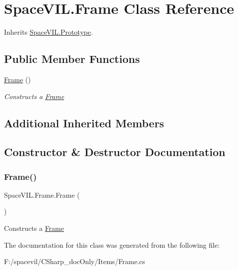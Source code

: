 \hypertarget{class_space_v_i_l_1_1_frame}{}\section{Space\+V\+I\+L.\+Frame Class Reference}
\label{class_space_v_i_l_1_1_frame}


Inherits \mbox{\hyperlink{class_space_v_i_l_1_1_prototype}{Space\+V\+I\+L.\+Prototype}}.

\subsection*{Public Member Functions}
\begin{DoxyCompactItemize}
\item 
\mbox{\hyperlink{class_space_v_i_l_1_1_frame_a637421f7d67b16e11064a78867a386db}{Frame}} ()
\begin{DoxyCompactList}\small\item\em Constructs a \mbox{\hyperlink{class_space_v_i_l_1_1_frame}{Frame}} \end{DoxyCompactList}\end{DoxyCompactItemize}
\subsection*{Additional Inherited Members}


\subsection{Constructor \& Destructor Documentation}
\mbox{\label{class_space_v_i_l_1_1_frame_a637421f7d67b16e11064a78867a386db}} 
\subsubsection{\texorpdfstring{Frame()}{Frame()}}
{\footnotesize\ttfamily Space\+V\+I\+L.\+Frame.\+Frame (\begin{DoxyParamCaption}{ }\end{DoxyParamCaption})}



Constructs a \mbox{\hyperlink{class_space_v_i_l_1_1_frame}{Frame}} 



The documentation for this class was generated from the following file\+:\begin{DoxyCompactItemize}
\item 
F\+:/spacevil/\+C\+Sharp\+\_\+doc\+Only/\+Items/Frame.\+cs\end{DoxyCompactItemize}
